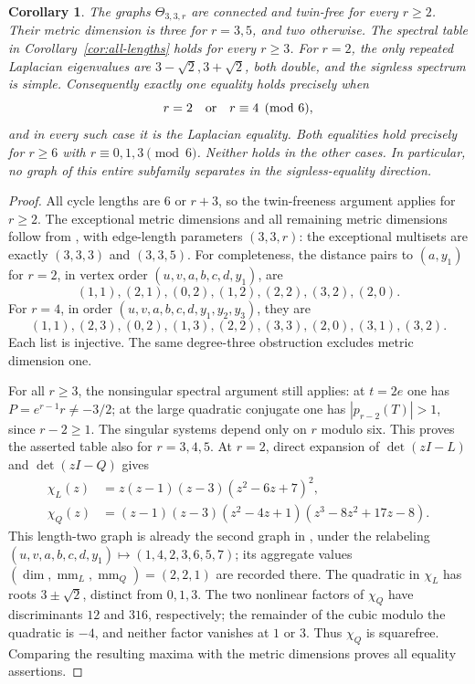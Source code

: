 \documentclass[11pt]{article}
\newtheorem{corollary}[theorem]{Corollary}
\newcommand{\mm}{\operatorname{mm}}
\newcommand{\Th}{\Theta}
\begin{document}
\begin{corollary}\label{cor:complete}
The graphs $\Th_{3,3,r}$ are connected and twin-free for every $r\geq2$.
Their metric dimension is three for $r=3,5$, and two otherwise.
The spectral table in Corollary~\ref{cor:all-lengths} holds for every
$r\geq3$. For $r=2$, the only repeated Laplacian eigenvalues are
$3-\sqrt2,3+\sqrt2$, both double, and the signless spectrum is simple.
Consequently exactly one equality holds precisely when
\[
 r=2\quad\hbox{or}\quad r\equiv4\pmod6,
\]
and in every such case it is the Laplacian equality.
Both equalities hold precisely for $r\geq6$ with $r\equiv0,1,3\pmod6$.
Neither holds in the other cases. In particular, no graph of this
entire subfamily separates in the signless-equality direction.
\end{corollary}
\begin{proof}
All cycle lengths are $6$ or $r+3$, so the twin-freeness argument
applies for $r\geq2$. The exceptional metric dimensions and all
remaining metric dimensions follow from
\cite[arXiv version, Theorems~8 and~14]{KSS}, with edge-length parameters
$(3,3,r)$: the exceptional multisets are exactly $(3,3,3)$ and $(3,3,5)$.
For completeness, the distance pairs to $(a,y_1)$ for $r=2$, in vertex
order $(u,v,a,b,c,d,y_1)$, are
\[
(1,1),(2,1),(0,2),(1,2),(2,2),(3,2),(2,0).
\]
For $r=4$, in order $(u,v,a,b,c,d,y_1,y_2,y_3)$, they are
\[
(1,1),(2,3),(0,2),(1,3),(2,2),(3,3),(2,0),(3,1),(3,2).
\]
Each list is injective. The same degree-three obstruction excludes
metric dimension one.

For all $r\geq3$, the nonsingular spectral argument still applies:
at $t=2e$ one has $P=e^{r-1}r\ne-3/2$; at the large quadratic conjugate
one has $|p_{r-2}(T)|>1$, since $r-2\geq1$.
The singular systems depend only on $r$ modulo six.
This proves the asserted table also for $r=3,4,5$.
At $r=2$, direct expansion of $\det(zI-L)$ and $\det(zI-Q)$ gives
\begin{align*}
 \chi_L(z)&=z(z-1)(z-3)(z^2-6z+7)^2,\\
 \chi_Q(z)&=(z-1)(z-3)(z^2-4z+1)(z^3-8z^2+17z-8).
\end{align*}
This length-two graph is already the second graph in
\cite[Table~2, p.~23]{AKS}, under the relabeling
$(u,v,a,b,c,d,y_1)\mapsto(1,4,2,3,6,5,7)$; its aggregate values
$(\dim,\mm_L,\mm_Q)=(2,2,1)$ are recorded there.
The quadratic in $\chi_L$ has roots $3\pm\sqrt2$, distinct from $0,1,3$.
The two nonlinear factors of $\chi_Q$ have discriminants $12$ and $316$,
respectively; the remainder of the cubic modulo the quadratic is $-4$,
and neither factor vanishes at $1$ or $3$.
Thus $\chi_Q$ is squarefree. Comparing the resulting maxima with the
metric dimensions proves all equality assertions.
\end{proof}
\end{document}
